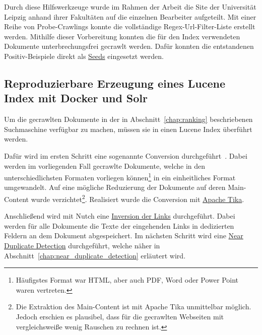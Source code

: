

Durch diese Hilfswerkzeuge wurde im Rahmen der Arbeit die Site der Universität Leipzig anhand ihrer Fakultäten auf die einzelnen Bearbeiter aufgeteilt.
Mit einer Reihe von Probe-Crawlings konnte die vollständige Regex-Url-Filter-Liste erstellt werden.
Mithilfe dieser Vorbereitung konnten die für den Index verwendeten Dokumente unterbrechungsfrei gecrawlt werden.
Dafür konnten die entstandenen Positiv-Beispiele direkt als \href{https://wiki.apache.org/nutch/NutchTutorial#Create_a_URL_seed_list-1}{Seeds} eingesetzt werden.

\subsection{Reproduzierbare Erzeugung eines Lucene Index mit Docker und Solr}

Um die gecrawlten Dokumente in der in Abschnitt~\ref{chap:ranking} beschriebenen Suchmaschine verfügbar zu machen, müssen sie in einen Lucene Index überführt werden.

Dafür wird im ersten Schritt eine sogenannte Conversion durchgeführt~\cite{croft.chap2}.
Dabei werden im vorliegenden Fall gecrawlte Dokumente,
welche in den unterschiedlichsten Formaten vorliegen können\footnote{Häufigstes Format war HTML, aber auch PDF, Word oder Power Point waren vertreten.}
in ein einheitliches Format umgewandelt.
Auf eine mögliche Reduzierung der Dokumente auf deren Main-Content wurde
verzichtet\footnote{Die Extraktion des Main-Content ist mit Apache Tika
unmittelbar möglich. Jedoch erschien es plausibel, dass für die gecrawlten Webseiten mit vergleichsweiße wenig Rauschen zu rechnen ist.}.
Realisiert wurde die Conversion mit \href{https://en.wikipedia.org/wiki/Apache_Tika}{Apache Tika}.

Anschließend wird mit Nutch eine \href{https://wiki.apache.org/nutch/bin/nutch_invertlinks}{Inversion der Links} durchgeführt.
Dabei werden für alle Dokumente die Texte der eingehenden Links in dedizierten Feldern an dem Dokument abgespeichert.
Im nächsten Schritt wird eine \href{https://github.com/apache/nutch/blob/master/src/java/org/apache/nutch/crawl/TextProfileSignature.java}{Near Duplicate Detection}
durchgeführt, welche näher in Abschnitt~\ref{chap:near_duplicate_detection} erläutert wird.

